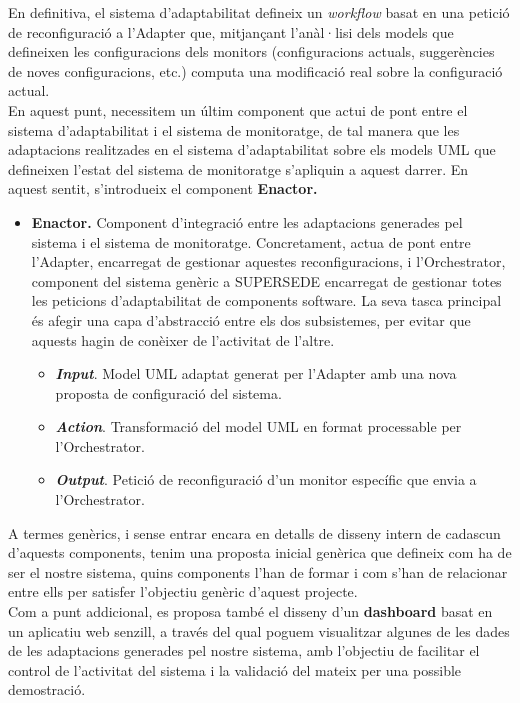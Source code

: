 En definitiva, el sistema d'adaptabilitat defineix un \textit{workflow} basat en una petició de reconfiguració a l'Adapter que, mitjançant l'anàl·lisi dels models que defineixen les configuracions dels monitors (configuracions actuals, suggerències de noves configuracions, etc.) computa una modificació real sobre la configuració actual.\\

En aquest punt, necessitem un últim component que actui de pont entre el sistema d'adaptabilitat i el sistema de monitoratge, de tal manera que les adaptacions realitzades en el sistema d'adaptabilitat sobre els models UML que defineixen l'estat del sistema de monitoratge s'apliquin a aquest darrer. En aquest sentit, s'introdueix el component \textbf{Enactor.}

\begin{itemize}
\item \textbf{Enactor.} Component d'integració entre les adaptacions generades pel sistema i el sistema de monitoratge. Concretament, actua de pont entre l'Adapter, encarregat de gestionar aquestes reconfiguracions, i l'Orchestrator, component del sistema genèric a SUPERSEDE encarregat de gestionar totes les peticions d'adaptabilitat de components software. La seva tasca principal és afegir una capa d'abstracció entre els dos subsistemes, per evitar que aquests hagin de conèixer de l'activitat de l'altre.
\begin{itemize}
\item \textbf{\textit{Input}}. Model UML adaptat generat per l'Adapter amb una nova proposta de configuració del sistema.
\item \textbf{\textit{Action}}. Transformació del model UML en format processable per l'Orchestrator.
\item \textbf{\textit{Output}}. Petició de reconfiguració d'un monitor específic que envia a l'Orchestrator.
\end{itemize}
\end{itemize}

A termes genèrics, i sense entrar encara en detalls de disseny intern de cadascun d'aquests components, tenim una proposta inicial genèrica que defineix com ha de ser el nostre sistema, quins components l'han de formar i com s'han de relacionar entre ells per satisfer l'objectiu genèric d'aquest projecte.\\

Com a punt addicional, es proposa també el disseny d'un \textbf{dashboard} basat en un aplicatiu web senzill, a través del qual poguem visualitzar algunes de les dades de les adaptacions generades pel nostre sistema, amb l'objectiu de facilitar el control de l'activitat del sistema i la validació del mateix per una possible demostració.

